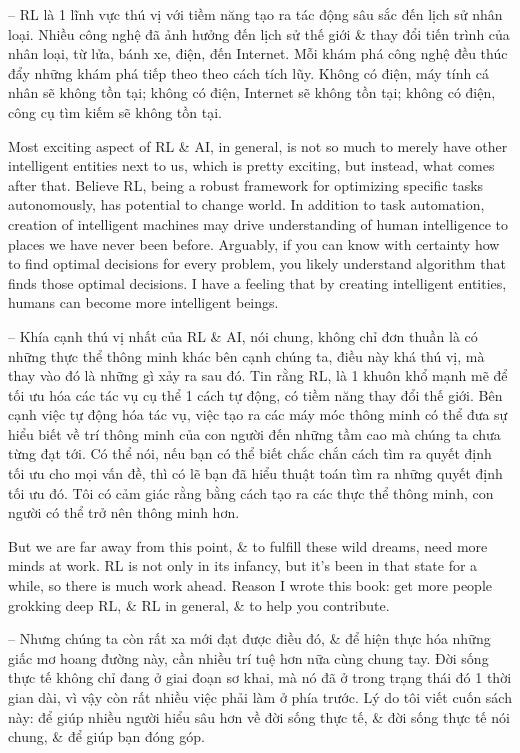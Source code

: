 \documentclass{article}
\begin{document}
\begin{itemize}
    -- RL là 1 lĩnh vực thú vị với tiềm năng tạo ra tác động sâu sắc đến lịch sử nhân loại. Nhiều công nghệ đã ảnh hưởng đến lịch sử thế giới \& thay đổi tiến trình của nhân loại, từ lửa, bánh xe, điện, đến Internet. Mỗi khám phá công nghệ đều thúc đẩy những khám phá tiếp theo theo cách tích lũy. Không có điện, máy tính cá nhân sẽ không tồn tại; không có điện, Internet sẽ không tồn tại; không có điện, công cụ tìm kiếm sẽ không tồn tại.

    Most exciting aspect of RL \& AI, in general, is not so much to merely have other intelligent entities next to us, which is pretty exciting, but instead, what comes after that. Believe RL, being a robust framework for optimizing specific tasks autonomously, has potential to change world. In addition to task automation, creation of intelligent machines may drive understanding of human intelligence to places we have never been before. Arguably, if you can know with certainty how to find optimal decisions for every problem, you likely understand algorithm that finds those optimal decisions. I have a feeling that by creating intelligent entities, humans can become more intelligent beings.

    -- Khía cạnh thú vị nhất của RL \& AI, nói chung, không chỉ đơn thuần là có những thực thể thông minh khác bên cạnh chúng ta, điều này khá thú vị, mà thay vào đó là những gì xảy ra sau đó. Tin rằng RL, là 1 khuôn khổ mạnh mẽ để tối ưu hóa các tác vụ cụ thể 1 cách tự động, có tiềm năng thay đổi thế giới. Bên cạnh việc tự động hóa tác vụ, việc tạo ra các máy móc thông minh có thể đưa sự hiểu biết về trí thông minh của con người đến những tầm cao mà chúng ta chưa từng đạt tới. Có thể nói, nếu bạn có thể biết chắc chắn cách tìm ra quyết định tối ưu cho mọi vấn đề, thì có lẽ bạn đã hiểu thuật toán tìm ra những quyết định tối ưu đó. Tôi có cảm giác rằng bằng cách tạo ra các thực thể thông minh, con người có thể trở nên thông minh hơn.

    But we are far away from this point, \& to fulfill these wild dreams, need more minds at work. RL is not only in its infancy, but it's been in that state for a while, so there is much work ahead. Reason I wrote this book: get more people grokking deep RL, \& RL in general, \& to help you contribute.

    -- Nhưng chúng ta còn rất xa mới đạt được điều đó, \& để hiện thực hóa những giấc mơ hoang đường này, cần nhiều trí tuệ hơn nữa cùng chung tay. Đời sống thực tế không chỉ đang ở giai đoạn sơ khai, mà nó đã ở trong trạng thái đó 1 thời gian dài, vì vậy còn rất nhiều việc phải làm ở phía trước. Lý do tôi viết cuốn sách này: để giúp nhiều người hiểu sâu hơn về đời sống thực tế, \& đời sống thực tế nói chung, \& để giúp bạn đóng góp.


\end{itemize}
\end{document}
